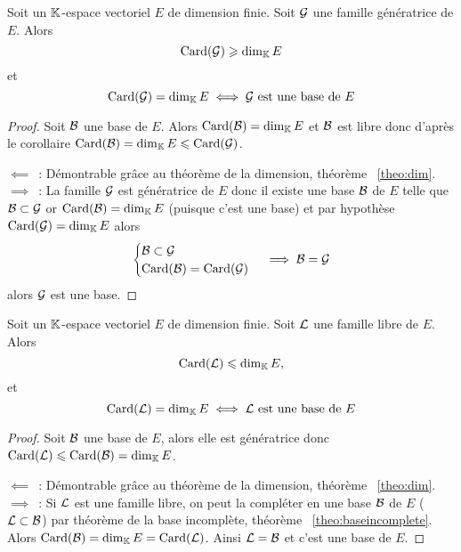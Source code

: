 \begin{theo}
  Soit un \(\mathbb{K}\)-espace vectoriel \(E\) de dimension finie. Soit \(\mathcal{G}\) une famille génératrice de \(E\). Alors
  \begin{equation}
    \operatorname{Card}(\mathcal{G}) \geqslant \operatorname{dim}_{\mathbb{K}} E
  \end{equation}
et
\begin{equation}
  \operatorname{Card}(\mathcal{G})=\operatorname{dim}_{\mathbb{K}} E \iff \mathcal{G} \text{~est une base de } E
\end{equation}
\end{theo}
\begin{proof}
  Soit \(\mathcal{B}\) une base de \(E\). Alors \(\operatorname{Card}(\mathcal{B})=\operatorname{dim}_{\mathbb{K}} E\) et \(\mathcal{B}\) est libre donc d'après le corollaire \(\operatorname{Card}(\mathcal{B}) = \operatorname{dim}_{\mathbb{K}} E \leqslant \operatorname{Card}(\mathcal{G})\).

  \(\impliedby\)~: Démontrable grâce au théorème de la dimension, théorème~
\ref{theo:dim}.
  \(\implies\)~: La famille \(\mathcal{G}\) est génératrice de \(E\) donc il existe une base \(\mathcal{B}\) de \(E\) telle que \(\mathcal{B} \subset \mathcal{G}\) or \(\operatorname{Card}(\mathcal{B}) = \operatorname{dim}_{\mathbb{K}} E\) (puisque c'est une base) et par hypothèse \(\operatorname{Card}(\mathcal{G}) = \operatorname{dim}_{\mathbb{K}} E\) alors
  \begin{equation}
    \begin{cases} \mathcal{B} \subset \mathcal{G} \\ \operatorname{Card}(\mathcal{B}) = \operatorname{Card}(\mathcal{G}) \end{cases} \implies \mathcal{B}=\mathcal{G}
  \end{equation}
  alors \(\mathcal{G}\) est une base.
\end{proof}

\begin{theo}
  Soit un \(\mathbb{K}\)-espace vectoriel \(E\) de dimension finie. Soit \(\mathcal{L}\) une famille libre de \(E\). Alors
  \begin{equation}
    \operatorname{Card}(\mathcal{L}) \leqslant \operatorname{dim}_{\mathbb{K}} E,
  \end{equation}
  et
  \begin{equation}
    \operatorname{Card}(\mathcal{L})=\operatorname{dim}_{\mathbb{K}} E \iff \mathcal{L} \text{~est une base de } E
  \end{equation}
\end{theo}
\begin{proof}
  Soit \(\mathcal{B}\) une base de \(E\), alors elle est génératrice donc \(\operatorname{Card}(\mathcal{L}) \leqslant \operatorname{Card}(\mathcal{B})=\operatorname{dim}_{\mathbb{K}} E\).

  \(\impliedby\)~: Démontrable grâce au théorème de la dimension, théorème~
\ref{theo:dim}.  
  \(\implies\)~: Si \(\mathcal{L}\) est une famille libre, on peut la compléter en une base \(\mathcal{B}\) de \(E\) (\(\mathcal{L} \subset \mathcal{B}\)) par théorème de la base incomplète, théorème~
\ref{theo:baseincomplete}. Alors \(\operatorname{Card}(\mathcal{B})=\operatorname{dim}_{\mathbb{K}} E = \operatorname{Card}(\mathcal{L})\). Ainsi \(\mathcal{L}=\mathcal{B}\) et c'est une base de \(E\).
\end{proof}

